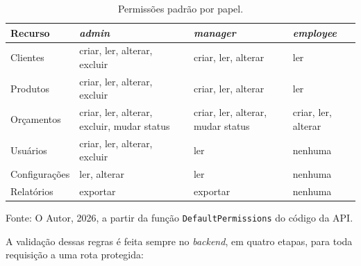 \begin{table}[H]
  \centering
  \caption{Permissões padrão por papel.}
  \label{tab:permissoes-papel}
  \small
  \begin{tabular}{p{3.2cm}p{3.4cm}p{3.4cm}p{3.4cm}}
    \hline
    \textbf{Recurso} & \textbf{\textit{admin}} & \textbf{\textit{manager}} & \textbf{\textit{employee}} \\
    \hline
    Clientes & criar, ler, alterar, excluir & criar, ler, alterar & ler \\
    Produtos & criar, ler, alterar, excluir & criar, ler, alterar & ler \\
    Orçamentos & criar, ler, alterar, excluir, mudar status & criar, ler, alterar, mudar status & criar, ler, alterar \\
    Usuários & criar, ler, alterar, excluir & ler & nenhuma \\
    Configurações & ler, alterar & ler & nenhuma \\
    Relatórios & exportar & exportar & nenhuma \\
    \hline
  \end{tabular}
  \begin{minipage}{0.95\textwidth}
    \vspace{0.3em}
    {\small Fonte: O Autor, 2026, a partir da função \texttt{DefaultPermissions} do código da API.}
  \end{minipage}
\end{table}

A validação dessas regras é feita sempre no \textit{backend}, em quatro etapas, para toda requisição a uma rota protegida:

